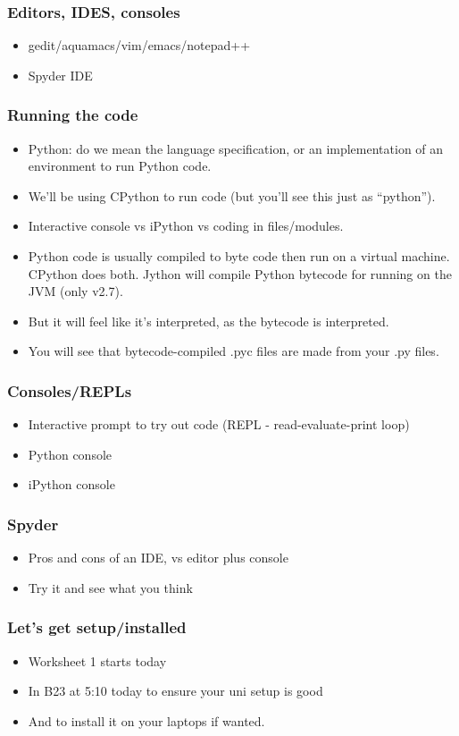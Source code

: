 \documentclass{beamer}
\begin{document}
\begin{frame}
\frametitle{Editors, IDES, consoles}
\begin{itemize}
\item gedit/aquamacs/vim/emacs/notepad++ 
\item Spyder IDE
\end{itemize}
\end{frame}

\begin{frame}
\frametitle{Running the code}
\begin{itemize}
\item Python: do we mean the language specification, or an implementation of an
  environment to run Python code.
\item We'll be using CPython to run code (but you'll see this just as ``python'').
\item Interactive console vs iPython vs coding in files/modules.
\item Python code is usually compiled to byte code then run on a virtual
  machine. CPython does both.  Jython will compile Python bytecode for
  running on the JVM (only v2.7).
\item But it will feel like it's interpreted, as the bytecode is
  interpreted. 
\item You will see that bytecode-compiled .pyc files are made
  from your .py files.
\end{itemize}
\end{frame}


\begin{frame}
\frametitle{Consoles/REPLs}
\begin{itemize}
\item Interactive prompt to try out code (REPL - read-evaluate-print
  loop)
\item Python console 
\item iPython console
\end{itemize}
\end{frame}


\begin{frame}
\frametitle{Spyder}
\begin{itemize}
\item Pros and cons of an IDE, vs editor plus console
\item Try it and see what you think
\end{itemize}
\end{frame}




\begin{frame}
\frametitle{Let's get setup/installed}
\begin{itemize}
\item Worksheet 1 starts today
\item In B23 at 5:10 today to ensure your uni setup is good 
\item And to install it on your laptops if wanted.
\end{itemize}
\end{frame}
\end{document}
